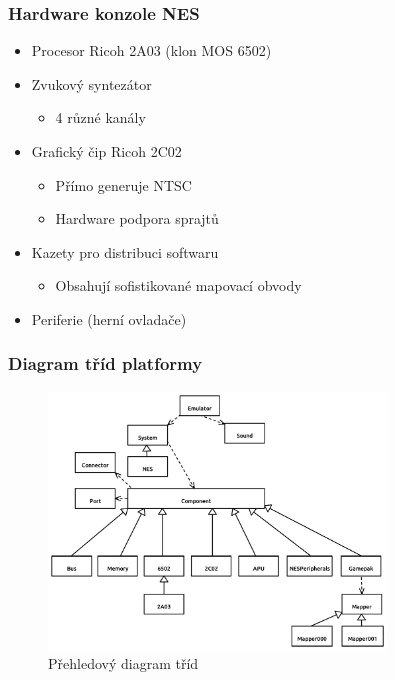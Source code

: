 \documentclass{beamer}
\begin{document}
\begin{frame}
	\frametitle{Hardware konzole NES}
	\begin{itemize}
		\item Procesor Ricoh 2A03 (klon MOS 6502)
		\item Zvukový syntezátor
		\begin{itemize}
			\item 4 různé kanály
		\end{itemize}
		\item Grafický čip Ricoh 2C02
		\begin{itemize}
			\item Přímo generuje NTSC
			\item Hardware podpora sprajtů
		\end{itemize}
		\item Kazety pro distribuci softwaru
		\begin{itemize}
			\item Obsahují sofistikované mapovací obvody
		\end{itemize}
		\item Periferie (herní ovladače)	
	\end{itemize}
\end{frame}

\begin{frame}
	\frametitle{Diagram tříd platformy}
	\begin{figure}
		\centering
		\includegraphics[width=0.8\textwidth]{images/navrh_prehled.pdf}
		\caption{\normalsize Přehledový diagram tříd}
	\end{figure}
\end{frame}
	
\end{document}
